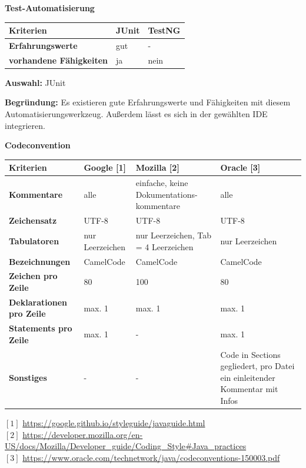\documentclass[12pt]{article}
\begin{document}
\newpage


\textbf{Test-Automatisierung}

\begin{tabularx}{\textwidth}{|X|X|X|}\hline
 \textbf{Kriterien}&\textbf{JUnit}&\textbf{TestNG}\\ \hline
 \textbf{Erfahrungswerte}&gut&-\\ \hline
 \textbf{vorhandene Fähigkeiten}&ja&nein\\ \hline
\end{tabularx}

\vspace*{3mm}

\textbf{Auswahl:} JUnit

\textbf{Begründung:} Es existieren gute Erfahrungswerte und Fähigkeiten mit diesem Automatisierungswerkzeug. Außerdem lässt es sich in der gewählten IDE integrieren.

\vspace*{10mm}

\textbf{Codeconvention}

\begin{tabularx}{\textwidth}{|X|X|X|X|}\hline
 \textbf{Kriterien}&\textbf{Google} [1]&\textbf{Mozilla} [2]&\textbf{Oracle} [3]\\ \hline
 \textbf{Kommentare}&alle&einfache, keine Dokumentations-kommentare&alle\\ \hline
 \textbf{Zeichensatz}&UTF-8&UTF-8&UTF-8\\ \hline
 \textbf{Tabulatoren}&nur Leerzeichen&nur Leerzeichen, Tab = 4 Leerzeichen&nur Leerzeichen\\ \hline
 \textbf{Bezeichnungen}&CamelCode&CamelCode&CamelCode\\ \hline
 \textbf{Zeichen pro Zeile}&80&100&80\\ \hline
 \textbf{Deklarationen pro Zeile}&max. 1&max. 1&max. 1\\ \hline
 \textbf{Statements pro Zeile}&max. 1&-&max. 1\\ \hline
 \textbf{Sonstiges}&-&-&Code in Sections gegliedert, pro Datei ein einleitender Kommentar mit Infos\\ \hline
\end{tabularx}

\vspace*{3mm}

$[1]$ \url{https://google.github.io/styleguide/javaguide.html} \\
$[2]$ \url{https://developer.mozilla.org/en-US/docs/Mozilla/Developer_guide/Coding_Style#Java_practices} \\
$[3]$ \url{https://www.oracle.com/technetwork/java/codeconventions-150003.pdf} \\
\end{document}
